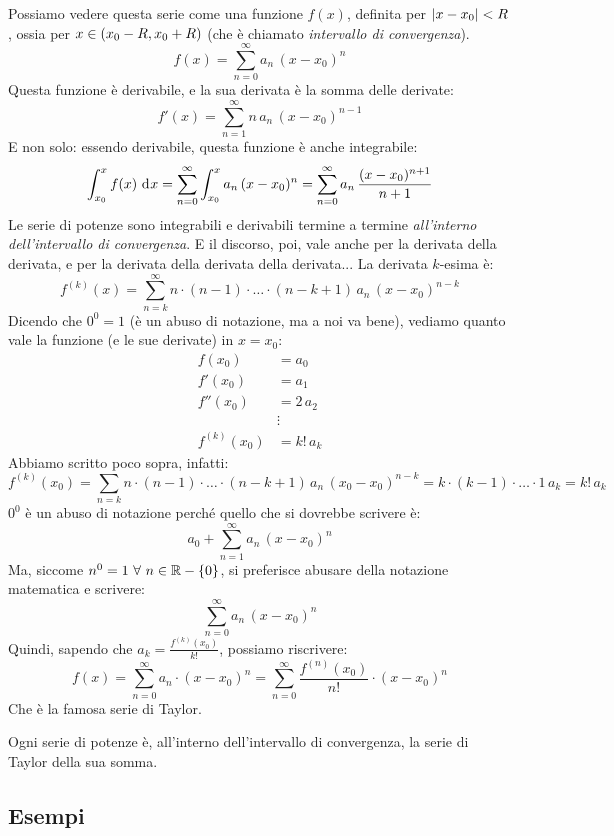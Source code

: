Possiamo vedere questa serie come una funzione $f(x)$, definita per $\left\lvert{x - x_0}\right\rvert < R$, ossia per $x \in \left( {x_0 - R}, {x_0 + R} \right)$ (che \`e chiamato \emph{intervallo di convergenza}). 
\[
f(x) = \sum_{n = 0}^{\infty} a_n \, (x - x_0)^n
\]
Questa funzione \`e derivabile, e la sua derivata \`e la somma delle derivate:
\[
f'(x) = \sum_{n = 1}^{\infty} n \, a_{n} \, (x - x_0)^{n - 1}
\]
E non solo: essendo derivabile, questa funzione \`e anche integrabile:
\[
\int_{x_0}^{x} f(x) \dx = 
\sum_{n = 0}^{\infty} \int_{x_0}^{x} a_n \, (x - x_0)^n =
\sum_{n = 0}^{\infty} a_n \, \frac{(x - x_0)^{n + 1}}{n + 1}
\]
Le serie di potenze sono integrabili e derivabili termine a termine \emph{all'interno dell'intervallo di convergenza}. E il discorso, poi, vale anche per la derivata della derivata, e per la derivata della derivata della derivata... La derivata $k$-esima \`e:
\[
	f^{(k)} (x) = \sum_{n = k}^{\infty} n \cdot (n - 1) \cdot \ldots \cdot (n - k + 1) \, a_n \, (x - x_0)^{n - k}
\]
Dicendo che $0^0 = 1$ (\`e un abuso di notazione, ma a noi va bene), vediamo quanto vale la funzione (e le sue derivate) in $x = x_0$:
\begin{align*}
f(x_0) &= a_0 \\
f'(x_0) &= a_1 \\
f''(x_0) &= 2 \, a_2 \\
&\vdots \\
f^{(k)}(x_0) &= k! \, a_k
\end{align*}
Abbiamo scritto poco sopra, infatti:
\[
f^{(k)} (x_0) = \sum_{n = k} n \cdot (n - 1) \cdot \ldots \cdot (n - k + 1) \, a_n \, (x_0 - x_0)^{n - k} =
k \cdot (k - 1) \cdot \ldots \cdot 1 \, a_{k} = k! \, a_{k}
\]
$0^0$ \`e un abuso di notazione perch\'e quello che si dovrebbe scrivere \`e:
\[
a_0 + \sum_{n = 1}^{\infty} a_n \, (x - x_0)^n
\]
Ma, siccome $n^0 = 1 \forall n \in \reals - \{ 0 \}$, si preferisce abusare della notazione matematica e scrivere:
\[
\sum_{n = 0}^{\infty} a_n \, (x - x_0)^n
\]
Quindi, sapendo che $a_k = \frac{f^{(k)}(x_0)}{k!}$, possiamo riscrivere:
\[
f(x) = \sum_{n = 0}^{\infty} a_n \cdot (x - x_0)^n =
\sum_{n = 0}^{\infty} \frac{f^{(n)} (x_0)}{n!} \cdot (x - x_0)^{n}
\]
Che \`e la famosa serie di Taylor.

Ogni serie di potenze \`e, all'interno dell'intervallo di convergenza, la serie di Taylor della sua somma.

\subsection{Esempi}

